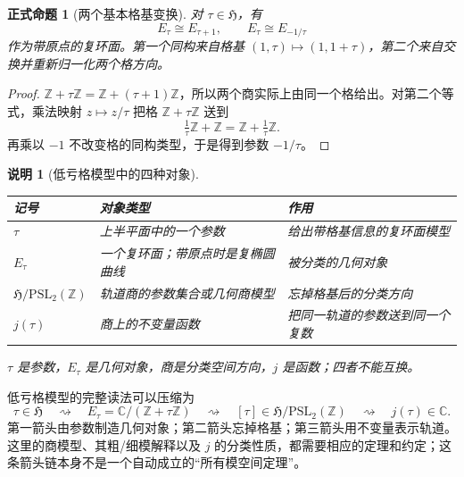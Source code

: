 \documentclass[UTF8,fontset=none,a4paper,11pt]{ctexart}
\theoremstyle{foundation-definition}
\theoremstyle{foundation-theorem}
\theoremstyle{foundation-proposition}
\newtheorem{proposition}[definition]{正式命题}
\theoremstyle{foundation-example}
\theoremstyle{foundation-remark}
\newtheorem{remark}[definition]{说明}
\theoremstyle{foundation-theorem}
\newcommand{\C}{\mathbb C}
\newcommand{\Z}{\mathbb Z}
\begin{document}
\begin{proposition}[两个基本格基变换]
对 \(\tau\in\mathfrak H\)，有
\[
E_\tau\cong E_{\tau+1},
\qquad
E_\tau\cong E_{-1/\tau}
\]
作为带原点的复环面。第一个同构来自格基 \((1,\tau)\mapsto(1,1+\tau)\)，第二个来自交换并重新归一化两个格方向。
\end{proposition}

\begin{proof}
\(\mathbb Z+\tau\mathbb Z=\mathbb Z+(\tau+1)\mathbb Z\)，所以两个商实际上由同一个格给出。对第二个等式，乘法映射 \(z\mapsto z/\tau\) 把格 \(\mathbb Z+\tau\mathbb Z\) 送到
\[
\tfrac1\tau\mathbb Z+\mathbb Z
=\mathbb Z+\tfrac1\tau\mathbb Z.
\]
再乘以 \(-1\) 不改变格的同构类型，于是得到参数 \(-1/\tau\)。
\end{proof}

\begin{remark}[低亏格模型中的四种对象]
\begin{center}
{\small
\setlength{\tabcolsep}{4pt}
\begin{tabularx}{\textwidth}{p{}|p{}|X}
\toprule
记号 & 对象类型 & 作用 \\
\midrule
\(\tau\) & 上半平面中的一个参数 & 给出带格基信息的复环面模型 \\
\(E_\tau\) & 一个复环面；带原点时是复椭圆曲线 & 被分类的几何对象 \\
\(\mathfrak H/\mathrm{PSL}_2(\mathbb Z)\) & 轨道商的参数集合或几何商模型 & 忘掉格基后的分类方向 \\
\(j(\tau)\) & 商上的不变量函数 & 把同一轨道的参数送到同一个复数 \\
\bottomrule
\end{tabularx}}
\end{center}
\(\tau\) 是参数，\(E_\tau\) 是几何对象，商是分类空间方向，\(j\) 是函数；四者不能互换。
\end{remark}

低亏格模型的完整读法可以压缩为
\[
\tau\in\mathfrak H
\quad\rightsquigarrow\quad
E_\tau=\C/(\Z+\tau\Z)
\quad\rightsquigarrow\quad
[\tau]\in\mathfrak H/\mathrm{PSL}_2(\mathbb Z)
\quad\rightsquigarrow\quad
j(\tau)\in\C.
\]
第一箭头由参数制造几何对象；第二箭头忘掉格基；第三箭头用不变量表示轨道。这里的商模型、其粗/细模解释以及 \(j\) 的分类性质，都需要相应的定理和约定；这条箭头链本身不是一个自动成立的“所有模空间定理”。
\end{document}
